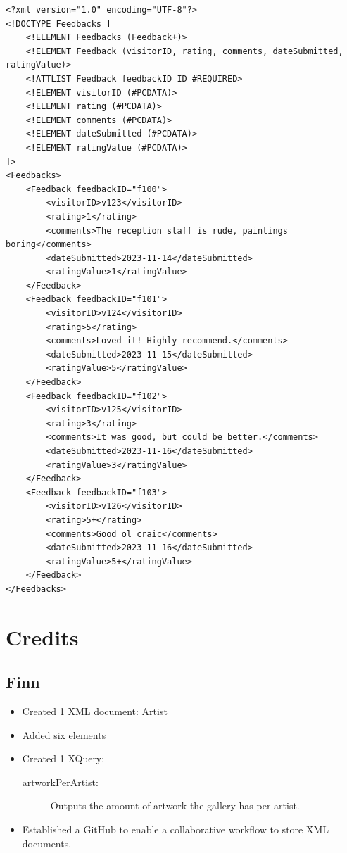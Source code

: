 \documentclass{article} %
\begin{document}
\begin{verbatim}
<?xml version="1.0" encoding="UTF-8"?>
<!DOCTYPE Feedbacks [
    <!ELEMENT Feedbacks (Feedback+)>
    <!ELEMENT Feedback (visitorID, rating, comments, dateSubmitted, ratingValue)>
    <!ATTLIST Feedback feedbackID ID #REQUIRED>
    <!ELEMENT visitorID (#PCDATA)>
    <!ELEMENT rating (#PCDATA)>
    <!ELEMENT comments (#PCDATA)>
    <!ELEMENT dateSubmitted (#PCDATA)>
    <!ELEMENT ratingValue (#PCDATA)>
]>
<Feedbacks>
    <Feedback feedbackID="f100">
        <visitorID>v123</visitorID>
        <rating>1</rating>
        <comments>The reception staff is rude, paintings boring</comments>
        <dateSubmitted>2023-11-14</dateSubmitted>
        <ratingValue>1</ratingValue>
    </Feedback>
    <Feedback feedbackID="f101">
        <visitorID>v124</visitorID>
        <rating>5</rating>
        <comments>Loved it! Highly recommend.</comments>
        <dateSubmitted>2023-11-15</dateSubmitted>
        <ratingValue>5</ratingValue>
    </Feedback>
    <Feedback feedbackID="f102">
        <visitorID>v125</visitorID>
        <rating>3</rating>
        <comments>It was good, but could be better.</comments>
        <dateSubmitted>2023-11-16</dateSubmitted>
        <ratingValue>3</ratingValue>
    </Feedback>
    <Feedback feedbackID="f103">
        <visitorID>v126</visitorID>
        <rating>5+</rating>
        <comments>Good ol craic</comments>
        <dateSubmitted>2023-11-16</dateSubmitted>
        <ratingValue>5+</ratingValue>
    </Feedback>
</Feedbacks>
\end{verbatim}

\newpage
\section{Credits}

\subsection{Finn}
\begin{itemize}
    \item Created 1 XML document: Artist
    \item Added six elements
    \item Created 1 XQuery:
    \begin{description}
        \item [artworkPerArtist:] Outputs the amount of artwork the gallery has per artist.
    \end{description}
    \item Established a GitHub to enable a collaborative workflow to store XML documents.
\end{itemize}
\end{document}
